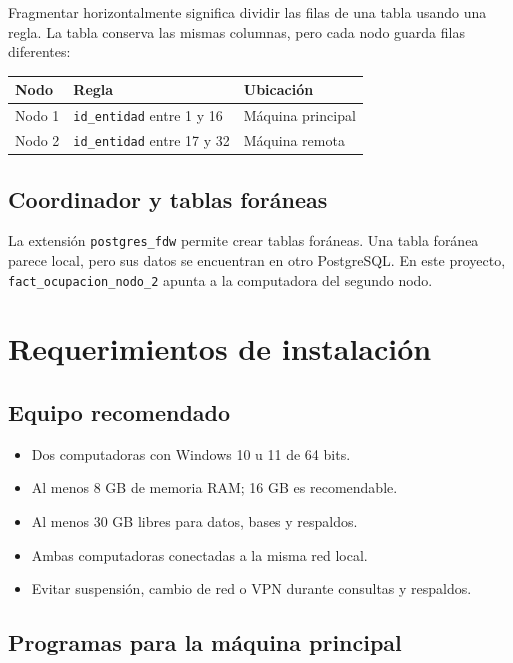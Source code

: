 \documentclass[12pt,letterpaper]{article}
\begin{document}
Fragmentar horizontalmente significa dividir las filas de una tabla usando una
regla. La tabla conserva las mismas columnas, pero cada nodo guarda filas
diferentes:

\begin{center}
\begin{tabular}{lll}
\toprule
\textbf{Nodo} & \textbf{Regla} & \textbf{Ubicación}\\
\midrule
Nodo 1 & \texttt{id\_entidad} entre 1 y 16 & Máquina principal\\
Nodo 2 & \texttt{id\_entidad} entre 17 y 32 & Máquina remota\\
\bottomrule
\end{tabular}
\end{center}

\subsection{Coordinador y tablas foráneas}

La extensión \texttt{postgres\_fdw} permite crear tablas foráneas. Una tabla
foránea parece local, pero sus datos se encuentran en otro PostgreSQL. En este
proyecto, \texttt{fact\_ocupacion\_nodo\_2} apunta a la computadora del segundo
nodo.

\section{Requerimientos de instalación}

\subsection{Equipo recomendado}

\begin{itemize}
  \item Dos computadoras con Windows 10 u 11 de 64 bits.
  \item Al menos 8 GB de memoria RAM; 16 GB es recomendable.
  \item Al menos 30 GB libres para datos, bases y respaldos.
  \item Ambas computadoras conectadas a la misma red local.
  \item Evitar suspensión, cambio de red o VPN durante consultas y respaldos.
\end{itemize}

\subsection{Programas para la máquina principal}
\end{document}
